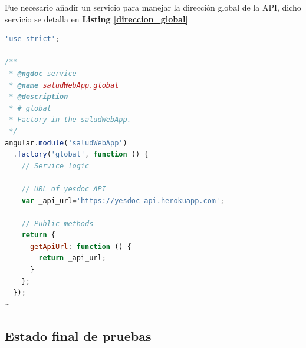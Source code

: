 \documentclass[a4paper,12pt]{article}
\begin{document}
Fue necesario añadir  un servicio para manejar la dirección global de la API, dicho servicio se detalla en \textbf{Listing \ref{direccion_global}}
\begin{lstlisting}[language=JavaScript, caption= Servicio de la dirección global de la API, label=direccion_global]
'use strict';                                                                   
                                                                                
/**                                                                             
 * @ngdoc service                                                               
 * @name saludWebApp.global                                                     
 * @description                                                                 
 * # global                                                                     
 * Factory in the saludWebApp.                                                  
 */                                                                             
angular.module('saludWebApp')                                                   
  .factory('global', function () {                                              
    // Service logic                                                               
                                                                                
    // URL of yesdoc API                                                           
    var _api_url='https://yesdoc-api.herokuapp.com';                               
                                                                                   
    // Public methods                                                              
    return {                                                                       
      getApiUrl: function () {                                                     
        return _api_url;                                                           
      }                                                                            
    };                                                                             
  });                                                                              
~                                                                            
\end{lstlisting}


\clearpage


\subsection{Estado final de pruebas}
\end{document}
